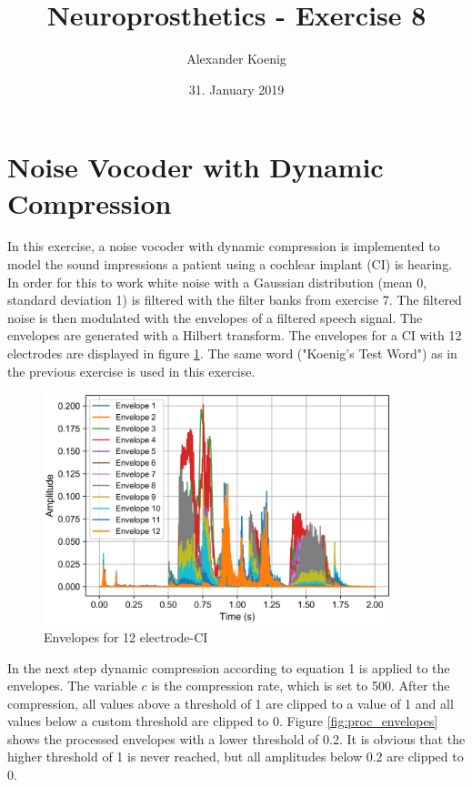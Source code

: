 \documentclass{scrartcl}
\title{Neuroprosthetics - Exercise 8}
\author{Alexander Koenig}
\date{31. January 2019}
\begin{document}
\maketitle

\section{Noise Vocoder with Dynamic Compression}

In this exercise, a noise vocoder with dynamic compression is implemented to model the sound impressions a patient using a cochlear implant (CI) is hearing. In order for this to work white noise with a Gaussian distribution (mean 0, standard deviation 1) is filtered with the filter banks from exercise 7. The filtered noise is then modulated with the envelopes of a filtered speech signal. The envelopes are generated with a Hilbert transform. The envelopes for a CI with 12 electrodes are displayed in figure \ref{fig:envelopes}. The same word ("Koenig's Test Word") as in the previous exercise is used in this exercise. 

\begin{figure}[h]
	\vspace{0.5cm}
	\centering
	\includegraphics[width=0.9\textwidth]{figures/envelopes}
	\caption{Envelopes for 12 electrode-CI}
	\label{fig:envelopes}
\end{figure}

\newpage
In the next step dynamic compression according to equation 1 is applied to the envelopes. The variable $c$ is the compression rate, which is set to 500. After the compression, all values above a threshold of 1 are clipped to a value of 1 and all values below a custom threshold are clipped to 0. Figure \ref{fig:proc_envelopes} shows the processed envelopes with a lower threshold of 0.2. It is obvious that the higher threshold of 1 is never reached, but all amplitudes below 0.2 are clipped to 0.
\end{document}
